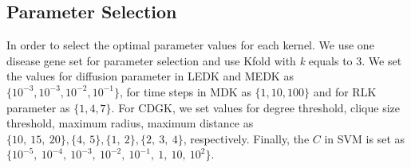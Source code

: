 \documentclass{esannV2}
\begin{document}
\subsection{Parameter Selection}
In order to select the optimal parameter values for each kernel. We use one disease gene set for parameter selection and use Kfold with \textit{k} equals to 3. We set the values for diffusion parameter in LEDK and MEDK as $\lbrace 10^{-3}, 10^{-3}, 10^{-2}, 10^{-1} \rbrace$, for time steps in MDK as $\lbrace 1, 10, 100 \rbrace$ and for RLK parameter as $\lbrace 1, 4, 7 \rbrace$. For CDGK, we set values for degree threshold, clique size threshold, maximum radius, maximum distance as $\lbrace 10,\ 15,\ 20 \rbrace, \lbrace 4,\ 5 \rbrace, \lbrace 1,\ 2 \rbrace, \lbrace 2,\ 3,\ 4 \rbrace$, respectively. Finally, the $C$ in SVM is set as $\lbrace 10^{-5},  \ 10^{-4}, \ 10^{-3},\ 10^{-2},\ 10^{-1},\ 1,\ 10,\ 10^2 \rbrace$.
\end{document}
